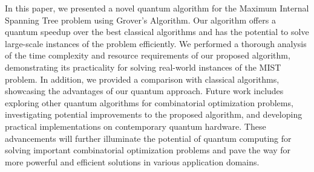 In this paper, we presented a novel quantum algorithm for the Maximum Internal Spanning Tree problem using Grover's Algorithm. Our algorithm offers a quantum speedup over the best classical algorithms and has the potential to solve large-scale instances of the problem efficiently. We performed a thorough analysis of the time complexity and resource requirements of our proposed algorithm, demonstrating its practicality for solving real-world instances of the MIST problem. In addition, we provided a comparison with classical algorithms, showcasing the advantages of our quantum approach. Future work includes exploring other quantum algorithms for combinatorial optimization problems, investigating potential improvements to the proposed algorithm, and developing practical implementations on contemporary quantum hardware. These advancements will further illuminate the potential of quantum computing for solving important combinatorial optimization problems and pave the way for more powerful and efficient solutions in various application domains.

